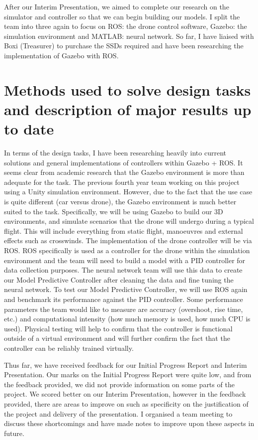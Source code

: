 \documentclass[11pt]{article}
\begin{document}
After our Interim Presentation, we aimed to complete our research on the simulator and controller so that we can begin building our models. I split the team into three again to focus on ROS: the drone control software, Gazebo: the simulation environment and MATLAB: neural network. So far, I have liaised with Boxi (Treasurer) to purchase the SSDs required and have been researching the implementation of Gazebo with ROS.

\section{Methods used to solve design tasks and description of major results up to date}\label{methods}
In terms of the design tasks, I have been researching heavily into current solutions and general implementations of controllers within Gazebo + ROS. It seems clear from academic research that the Gazebo environment is more than adequate for the task. The previous fourth year team working on this project using a Unity simulation environment. However, due to the fact that the use case is quite different (car versus drone), the Gazebo environment is much better suited to the task. Specifically, we will be using Gazebo to build our 3D environments, and simulate scenarios that the drone will undergo during a typical flight. This will include everything from static flight, manoeuvres and external effects such as crosswinds. The implementation of the drone controller will be via ROS. ROS specifically is used as a controller for the drone within the simulation environment and the team will need to build a model with a PID controller for data collection purposes. The neural network team will use this data to create our Model Predictive Controller after cleaning the data and fine tuning the neural network. To test our Model Predictive Controller, we will use ROS again and benchmark its performance against the PID controller. Some performance parameters the team would like to measure are accuracy (overshoot, rise time, etc.) and computational intensity (how much memory is used, how much CPU is used). Physical testing will help to confirm that the controller is functional outside of a virtual environment and will further confirm the fact that the controller can be reliably trained virtually.

Thus far, we have received feedback for our Initial Progress Report and Interim Presentation. Our marks on the Initial Progress Report were quite low, and from the feedback provided, we did not provide information on some parts of the project. We scored better on our Interim Presentation, however in the feedback provided, there are areas to improve on such as specificity on the justification of the project and delivery of the presentation. I organised a team meeting to discuss these shortcomings and have made notes to improve upon these aspects in future.
\end{document}
